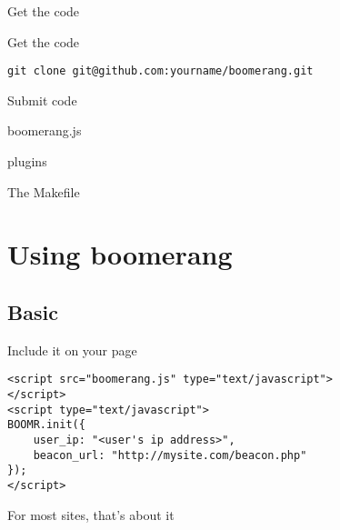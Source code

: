 \documentclass{beamer}
\begin{document}
\begin{frame}{Get the code}
\end{frame}

\begin{frame}{Get the code}
  \begin{center}
  \texttt{git clone git@github.com:yourname/boomerang.git}
  \end{center}
\end{frame}

\begin{frame}{Submit code}
\end{frame}

\begin{frame}{boomerang.js}
\end{frame}

\begin{frame}{plugins}
\end{frame}

\begin{frame}{The Makefile}
\end{frame}

\section{Using boomerang}
\label{sec:use}

\subsection{Basic}

\begin{frame}[fragile]{Include it on your page}
  \begin{verbatim}
<script src="boomerang.js" type="text/javascript">
</script>
<script type="text/javascript">
BOOMR.init({
    user_ip: "<user's ip address>",
    beacon_url: "http://mysite.com/beacon.php"
});
</script>
  \end{verbatim}
\end{frame}

\begin{frame}{}
  \begin{center}
  For most sites, that's about it
  \end{center}
\end{frame}
\end{document}
